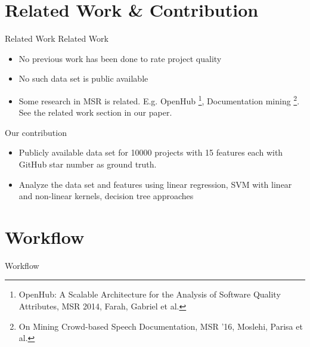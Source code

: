 \documentclass[presentation]{beamer}
\begin{document}
\section{Related Work \& Contribution}
\begin{frame}{Related Work}
  Related Work
  \begin{itemize}
  \item No previous work has been done to rate project quality
  \item No such data set is public available
  \item Some research in MSR is related. E.g. OpenHub
    \footnote{OpenHub: A Scalable Architecture for the Analysis of
      Software Quality Attributes, MSR 2014, Farah, Gabriel et al.},
    Documentation mining \footnote{On Mining Crowd-based Speech
      Documentation, MSR '16, Moslehi, Parisa et al.}. See the related
    work section in our paper.
  \end{itemize}

  Our contribution
  \begin{itemize}
  \item Publicly available data set for 10000 projects with
    15 features each with GitHub star number as ground truth.
  \item Analyze the data set and features using linear regression, SVM
    with linear and non-linear kernels, decision tree approaches
  \end{itemize}
\end{frame}


\section{Workflow}
\begin{frame}{Workflow}

  \centering

\end{frame}
\end{document}
